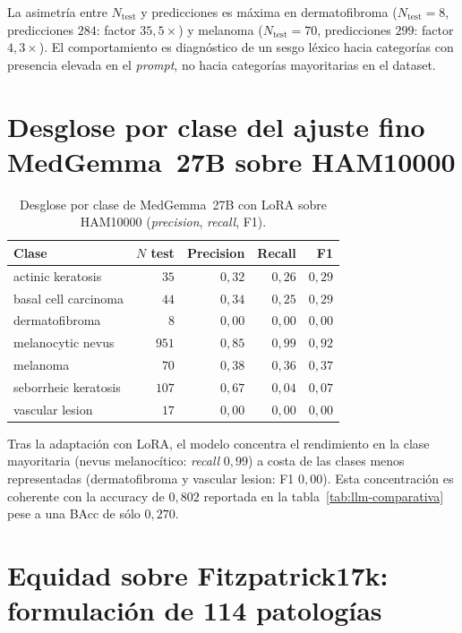 La asimetría entre $N_{\mathrm{test}}$ y predicciones es máxima en
dermatofibroma ($N_{\mathrm{test}} = 8$, predicciones $284$:
factor $35{,}5\times$) y melanoma ($N_{\mathrm{test}} = 70$,
predicciones $299$: factor $4{,}3\times$). El comportamiento es
diagnóstico de un sesgo léxico hacia categorías con presencia
elevada en el \emph{prompt}, no hacia categorías mayoritarias en el
dataset.

\section{Desglose por clase del ajuste fino MedGemma~27B sobre HAM10000}
\label{sec:anexob-medgemma}

\begin{table}[H]
\centering
\footnotesize
\setlength{\tabcolsep}{4pt}
\renewcommand{\arraystretch}{0.95}
\caption{Desglose por clase de MedGemma~27B con LoRA sobre
HAM10000 (\emph{precision}, \emph{recall}, F1).}
\label{tab:anexob-medgemma}
\begin{tabular}{lrrrr}
\hline
Clase                       & $N$ test & Precision & Recall    & F1 \\
\hline
actinic keratosis           & $35$     & $0{,}32$  & $0{,}26$  & $0{,}29$ \\
basal cell carcinoma        & $44$     & $0{,}34$  & $0{,}25$  & $0{,}29$ \\
dermatofibroma              & $8$      & $0{,}00$  & $0{,}00$  & $0{,}00$ \\
melanocytic nevus           & $951$    & $0{,}85$  & $0{,}99$  & $0{,}92$ \\
melanoma                    & $70$     & $0{,}38$  & $0{,}36$  & $0{,}37$ \\
seborrheic keratosis        & $107$    & $0{,}67$  & $0{,}04$  & $0{,}07$ \\
vascular lesion             & $17$     & $0{,}00$  & $0{,}00$  & $0{,}00$ \\
\hline
\end{tabular}
\end{table}

Tras la adaptación con LoRA, el modelo concentra el rendimiento en
la clase mayoritaria (nevus melanocítico: \emph{recall}
$0{,}99$) a costa de las clases menos representadas
(dermatofibroma y vascular lesion: F1 $0{,}00$). Esta
concentración es coherente con la accuracy de $0{,}802$
reportada en la tabla~\ref{tab:llm-comparativa} pese a una BAcc
de sólo $0{,}270$.

\section{Equidad sobre Fitzpatrick17k: formulación de 114 patologías}
\label{sec:anexob-fst-114}

